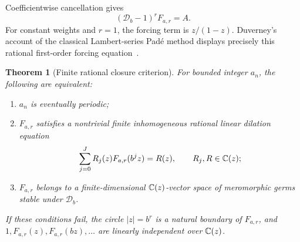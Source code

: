\documentclass[11pt,a4paper]{article}
\newtheorem{theorem}{Theorem}[section]
\theoremstyle{definition}\newtheorem{definition}[theorem]{Definition}
\theoremstyle{remark}\newtheorem*{remark}{Remark}
\begin{document}
Coefficientwise cancellation gives
\begin{equation}\label{eq:dilation}
 (\mathcal D_b-1)^rF_{a,r}=A.
\end{equation}
For constant weights and $r=1$, the forcing term is $z/(1-z)$. Duverney's
account of the classical Lambert-series Pad\'e method displays precisely this
rational first-order forcing equation~\cite[Eq.~(10)]{duverney}.

\begin{theorem}[Finite rational closure criterion]\label{thm:dilation}
For bounded integer $a_n$, the following are equivalent:
\begin{enumerate}[label=(\roman*),itemsep=0pt]
\item $a_n$ is eventually periodic;
\item $F_{a,r}$ satisfies a nontrivial finite inhomogeneous rational linear
 dilation equation
 \[\sum_{j=0}^J R_j(z)F_{a,r}(b^jz)=R(z),\qquad R_j,R\in\mathbb C(z);\]
\item $F_{a,r}$ belongs to a finite-dimensional $\mathbb C(z)$-vector space of
 meromorphic germs stable under $\mathcal D_b$.
\end{enumerate}
If these conditions fail, the circle $|z|=b^r$ is a natural boundary of
$F_{a,r}$, and $1,F_{a,r}(z),F_{a,r}(bz),\ldots$ are linearly independent over
$\mathbb C(z)$.
\end{theorem}
\end{document}
